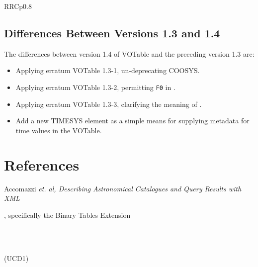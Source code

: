 \begin{tabular}{RRCp{0.8\textwidth}}
\begin{center}
{\subsection{Differences Between Versions 1.3 and 1.4}
\label{diff1.3-1.4}
The differences between version 1.4 of VOTable and the preceding
version 1.3 are:

\ifhtx{}
\fi
\begin{itemize}
\item Applying erratum VOTable 1.3-1, un-deprecating COOSYS.
\item Applying erratum VOTable 1.3-2, permitting \verb|F0| in
.
\item Applying erratum VOTable 1.3-3, clarifying the meaning of
.
\item Add a new TIMESYS element as a simple means for 
     supplying metadata for time values in the VOTable.
\end{itemize}
\ifhtx{}\fi

\section{References}
\noindent [1] Accomazzi {\it  et. al, Describing Astronomical Catalogues and
Query Results with XML
}\\ 

, specifically the Binary Tables
Extension
\\ 

\\ 

\\  (UCD1)
\\ 

\\ 

}
\end{center}
\end{tabular}

